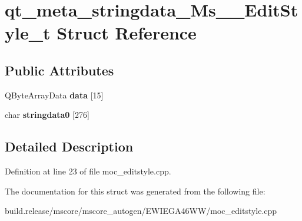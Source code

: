 \hypertarget{structqt__meta__stringdata___ms_____edit_style__t}{}\section{qt\+\_\+meta\+\_\+stringdata\+\_\+\+Ms\+\_\+\+\_\+\+Edit\+Style\+\_\+t Struct Reference}
\label{structqt__meta__stringdata___ms_____edit_style__t}
\subsection*{Public Attributes}
\begin{DoxyCompactItemize}
\item 
\mbox{\label{structqt__meta__stringdata___ms_____edit_style__t_a300f5ca5e2a41f0f41e36d7793bc1f80}} 
Q\+Byte\+Array\+Data {\bfseries data} \mbox{[}15\mbox{]}
\item 
\mbox{\label{structqt__meta__stringdata___ms_____edit_style__t_a5224c1b15cf97f8818d9329a495bf7c2}} 
char {\bfseries stringdata0} \mbox{[}276\mbox{]}
\end{DoxyCompactItemize}


\subsection{Detailed Description}


Definition at line 23 of file moc\+\_\+editstyle.\+cpp.



The documentation for this struct was generated from the following file\+:\begin{DoxyCompactItemize}
\item 
build.\+release/mscore/mscore\+\_\+autogen/\+E\+W\+I\+E\+G\+A46\+W\+W/moc\+\_\+editstyle.\+cpp\end{DoxyCompactItemize}
